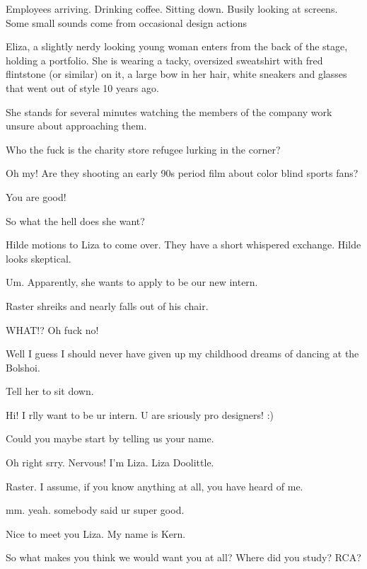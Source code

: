 \act


Employees arriving.  Drinking coffee.  Sitting down. Busily looking at screens.  Some small sounds come from occasional design actions 

Eliza, a slightly nerdy looking young woman enters from the back of the stage, holding a portfolio.  She is wearing a tacky, oversized sweatshirt with fred flintstone (or similar) on it, a large bow in her hair, white sneakers and glasses that went out of style 10 years ago.

She stands for several minutes watching the members of the company work unsure about approaching them.


 Who the fuck is the charity store refugee lurking in the corner?

 Oh my! Are they shooting an early 90s period film about color blind sports fans?

 You are good!

 So what the hell does she want?

Hilde motions to Liza to come over.  They have a short whispered exchange.  Hilde looks skeptical.

 Um.  Apparently, she wants to apply to be our new intern.

Raster shreiks and nearly falls out of his chair.

 WHAT!?  Oh fuck no!

 Well I guess I should never have given up my childhood dreams of dancing at the Bolshoi.

 Tell her to sit down.

 Hi!  I rlly want to be ur intern.  U are sriously pro designers! :)

 Could you maybe start by telling us your name.

 Oh right srry.  Nervous!  I'm Liza.  Liza Doolittle.

 Raster.  I assume, if you know anything at all, you have heard of me.

 mm.  yeah.  somebody said ur super good.

 Nice to meet you Liza.  My name is Kern.

 So what makes you think we would want you at all?  Where did you study?  RCA?

